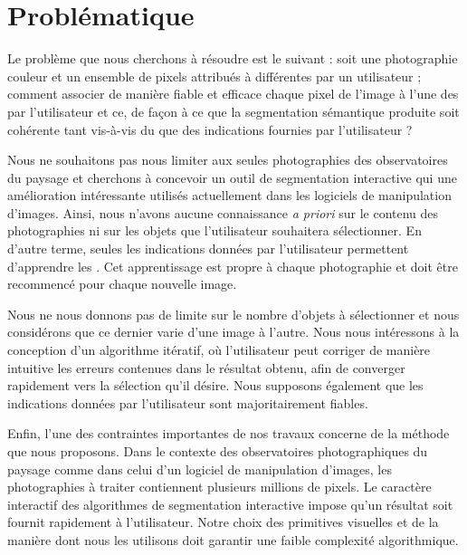  
\section{Problématique}

Le problème que nous cherchons à résoudre est le suivant : soit une photographie couleur et un ensemble de pixels attribués à différentes  par un utilisateur ; comment associer de manière fiable et efficace chaque pixel de l'image à l'une des  par l'utilisateur et ce, de façon à ce que la segmentation sémantique produite soit cohérente tant vis-à-vis du  que des indications fournies par l'utilisateur ? 


Nous ne souhaitons pas nous limiter aux seules photographies des observatoires du paysage et cherchons à concevoir un outil de segmentation interactive qui  une amélioration intéressante  utilisés actuellement dans les logiciels de manipulation d'images. Ainsi, nous n'avons aucune connaissance \textit{a priori} sur le contenu des photographies ni sur les objets que l'utilisateur souhaitera sélectionner. En d'autre terme, seules les indications données par l'utilisateur permettent d'apprendre les . Cet apprentissage est propre à chaque photographie et doit être recommencé pour chaque nouvelle image. 

\begin{emodif}
Nous ne nous donnons pas de limite sur le nombre d'objets à sélectionner et nous considérons que ce dernier varie d'une image à l'autre. Nous nous intéressons à la conception d'un algorithme itératif, où l'utilisateur peut corriger de manière intuitive les erreurs contenues dans le résultat obtenu, afin de converger rapidement vers la sélection qu'il désire. Nous supposons également que les indications données par l'utilisateur sont majoritairement fiables. 
\end{emodif}

Enfin, l'une des contraintes importantes de nos travaux concerne  de la méthode que nous proposons. Dans le contexte des observatoires photographiques du paysage comme dans celui d'un logiciel de manipulation d'images, les photographies à traiter contiennent plusieurs millions de pixels. Le caractère interactif des algorithmes de segmentation interactive impose qu'un résultat soit fournit rapidement à l'utilisateur.  Notre choix des primitives visuelles et de la manière dont nous les utilisons doit garantir une faible complexité algorithmique.


